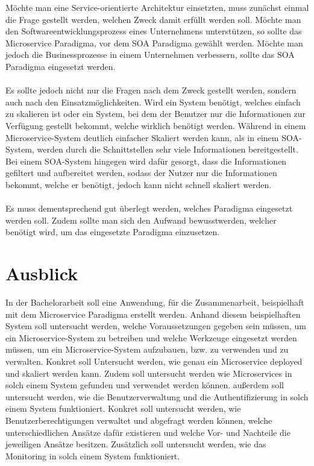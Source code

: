 Möchte man eine Service-orientierte Architektur einsetzten, muss zunächst einmal die Frage gestellt werden, welchen Zweck damit erfüllt werden soll. Möchte man den Softwareentwicklungsprozess eines Unternehmens unterstützen, so sollte das Microservice Paradigma, vor dem SOA Paradigma  gewählt werden. Möchte man jedoch die Businessprozesse in einem Unternehmen verbessern, sollte das SOA Paradigma eingesetzt werden.
\\\\
Es sollte jedoch nicht nur die Fragen nach dem Zweck gestellt werden, sondern auch nach den Einsatzmöglichkeiten. Wird ein System benötigt, welches einfach zu skalieren ist oder ein System, bei dem der Benutzer nur die Informationen zur Verfügung gestellt bekommt, welche wirklich benötigt werden. Während in einem Microservice-System deutlich einfacher Skaliert werden kann, als in einem SOA-System, werden durch die Schnittstellen sehr viele Informationen bereitgestellt. Bei einem SOA-System hingegen wird dafür gesorgt, dass die Informationen gefiltert und aufbereitet werden, sodass der Nutzer nur die Informationen bekommt, welche er benötigt, jedoch kann nicht schnell skaliert werden.
\\\\
Es muss dementsprechend gut überlegt werden, welches Paradigma eingesetzt werden soll. Zudem sollte man sich den Aufwand bewusstwerden, welcher benötigt wird, um das eingesetzte Paradigma einzusetzen.

\section{Ausblick}
\label{sec:Ausblick}
In der Bachelorarbeit soll eine Anwendung, für die Zusammenarbeit, beispielhaft mit dem Microservice Paradigma erstellt werden. Anhand diesem beispielhaften System soll untersucht werden, welche Voraussetzungen gegeben sein müssen, um ein Microservice-System zu betreiben und welche Werkzeuge eingesetzt werden müssen, um ein Microservice-System aufzubauen, bzw. zu verwenden und zu verwalten. Konkret soll Untersucht werden, wie genau ein Microservice deployed und skaliert werden kann. Zudem soll untersucht werden wie Microservices in solch einem System gefunden und verwendet werden können. außerdem soll untersucht werden, wie die Benutzerverwaltung und die Authentifizierung in solch einem System funktioniert. Konkret soll untersucht werden, wie Benutzerberechtigungen verwaltet und abgefragt werden können, welche unterschiedlichen Ansätze dafür existieren und welche Vor- und Nachteile die jeweiligen Ansätze besitzen. Zusätzlich soll untersucht werden, wie das Monitoring in solch einem System funktioniert.